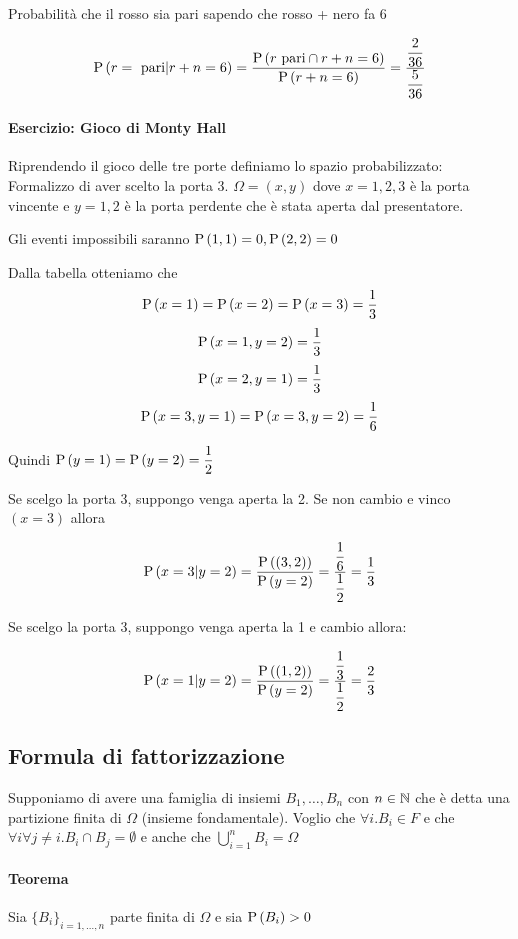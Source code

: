 Probabilità che il rosso sia pari sapendo che rosso + nero fa 6

\[ \text{P}\left(r = \text{ pari} | r+n = 6\right) = \dfrac{\text{P}\left(r \text{ pari} \cap r+n = 6\right)}{\text{P}\left(r+n = 6\right)} = \dfrac{\dfrac{2}{36}}{\dfrac{5}{36}} \]

\paragraph{Esercizio: Gioco di Monty Hall}
Riprendendo il gioco delle tre porte definiamo lo spazio probabilizzato: Formalizzo di aver scelto la porta 3. $ \Omega = (x,y) $ dove $ x = 1,2,3 $ è la porta vincente e $ y = 1,2 $ è la porta perdente che è stata aperta dal presentatore.

Gli eventi impossibili saranno $ \text{P}\left(1,1\right) = 0, \text{P}\left(2,2\right) = 0 $


Dalla tabella otteniamo che
\[ \text{P}\left(x=1\right) = \text{P}\left(x=2\right) = \text{P}\left(x=3\right) = \dfrac{1}{3} \]
\[ \text{P}\left(x=1,y=2\right) = \dfrac{1}{3} \]
\[ \text{P}\left(x=2,y=1\right) = \dfrac{1}{3} \]
\[ \text{P}\left(x=3,y=1\right) = \text{P}\left(x=3,y=2\right) = \dfrac{1}{6} \]

Quindi $ \text{P}\left(y=1\right) = \text{P}\left(y=2\right) = \dfrac{1}{2} $

Se scelgo la porta 3, suppongo venga aperta la 2. Se non cambio e vinco $ (x = 3) $ allora

\[ \text{P}\left(x=3 | y=2\right) = \dfrac{\text{P}\left((3,2)\right)}{\text{P}\left(y=2\right)} = \dfrac{\dfrac{1}{6}}{\dfrac{1}{2}} = \dfrac{1}{3} \]

Se scelgo la porta 3, suppongo venga aperta la 1 e cambio allora:

\[ \text{P}\left(x=1 | y=2\right) = \dfrac{\text{P}\left((1,2)\right)}{\text{P}\left(y=2\right)} = \dfrac{\dfrac{1}{3}}{\dfrac{1}{2}} = \dfrac{2}{3} \]

\subsection{Formula di fattorizzazione}
Supponiamo di avere una famiglia di insiemi $ B_1, \dots, B_n $ con $ n \in \mathbb{N} $ che è detta una partizione finita di $ \Omega $ (insieme fondamentale). Voglio che $ \forall i . B_i \in F $ e che $ \forall i \forall j\neq i . B_i \cap B_j = \emptyset $ e anche che $ \bigcup_{i=1}^{n} B_i = \Omega $

\paragraph{Teorema}

Sia $ \{B_i\}_{i=1, \dots, n} $ parte finita di $ \Omega $ e sia $ \text{P}\left(B_i\right) > 0 $

